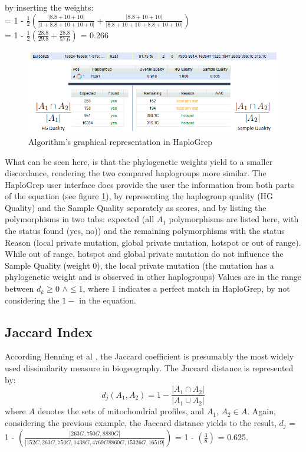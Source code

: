 by inserting the weights:
\\= 1 - $\frac{1}{2} \left(  \frac{\left| 8.8 + 10 +10 \right|}{\left| 1 + 8.8 + 10 +10 +0 \right|} +\frac{\left| 8.8 + 10 + 10 \right|}{\left| 8.8 + 10 + 10 + 8.8+ 10 +10 \right|} \right)$ 
\\= 1 - $\frac{1}{2} \left(  \frac{28.8}{29.8} +\frac{28.8}{57.6} \right)$ = 0.266\\
\begin{figure}[!ht]
    \centering
    \includegraphics[width=1\textwidth]{images/HG-sample-qual.png}
    \caption[Algorithm's graphical representation in HaploGrep]{ Algorithm's graphical representation in HaploGrep} 
    \label{hg:kulczy}
\end{figure}

What can be seen here, is that the phylogenetic weights yield to a smaller discordance, rendering the two compared haplogroups more similar. The HaploGrep user interface does provide the user the information from both parts of the equation (see figure \ref{hg:kulczy}), by representing the haplogroup quality (HG Quality) and the Sample Quality separately as scores, and by listing the polymorphisms in two tabs: expected (all $A_1$ polymorphisms are listed here, with the status found (yes, no)) and the remaining polymorphisms with the status Reason (local private mutation, global private mutation, hotspot or out of range). While out of range, hotspot and global private mutation do not influence the Sample Quality (weight 0), the local private mutation (the mutation has a phylogenetic weight and is observed in other haplogroups)  
Values are in the range between $d_k \geq 0 $ $ \wedge \leq 1$, where $1$ indicates a perfect match in HaploGrep, by not considering the $1-$ in the equation. 

\subsection{Jaccard Index}
According Henning et al \cite{Hennig2006}, the Jaccard coefficient \cite{Jaccard1901} is presumably the most widely used dissimilarity measure in biogeography. The Jaccard distance is represented by:
\begin{equation}
d_j (A_1, A_2) = 1 -  \frac{\left|A_1  \cap A_2\right| }{\left|A_1 \cup A_2\right|} 
\end{equation}
where $A$ denotes the sets of mitochondrial profiles, and $A_1$, $A_2 \in A$. Again, considering the previous example, the Jaccard distance yields to the result, $d_j$ =
1 - $\left(  \frac{\left| 263G, 750G, 8880G \right|}{\left| 152C, 263G, 750G, 1438G, 4769G 8860G,15326G, 16519 \right|}  \right)$  = 
1 -  $\left(  \frac{3}{8} \right)$ = 0.625. 

